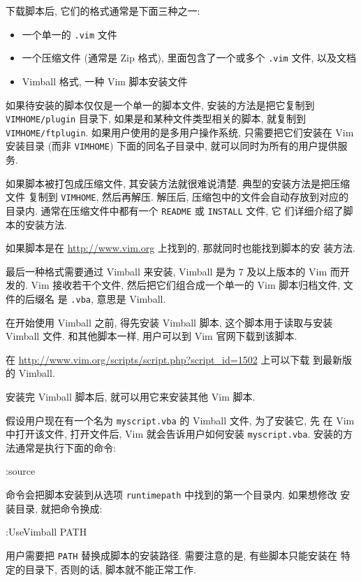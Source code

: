 下载脚本后, 它们的格式通常是下面三种之一:
\begin{itemize}
    \item 一个单一的 \texttt{.vim} 文件
    \item 一个压缩文件 (通常是 Zip 格式), 里面包含了一个或多个 \texttt{.vim}
        文件, 以及文档
    \item Vimball 格式, 一种 Vim 脚本安装文件
\end{itemize}

如果待安装的脚本仅仅是一个单一的脚本文件, 安装的方法是把它复制到
\texttt{VIMHOME/plugin} 目录下, 如果是和某种文件类型相关的脚本, 就复制到
\texttt{VIMHOME/ftplugin}.
如果用户使用的是多用户操作系统, 只需要把它们安装在 Vim 安装目录 (而非
\texttt{VIMHOME}) 下面的同名子目录中, 就可以同时为所有的用户提供服务.

如果脚本被打包成压缩文件, 其安装方法就很难说清楚. 典型的安装方法是把压缩文件
复制到 \texttt{VIMHOME}, 然后再解压. 解压后, 压缩包中的文件会自动存放到对应的
目录内. 通常在压缩文件中都有一个 \texttt{README} 或 \texttt{INSTALL} 文件, 它
们详细介绍了脚本的安装方法.

\begin{warning}
    如果脚本是在 \url{http://www.vim.org} 上找到的, 那就同时也能找到脚本的安
    装方法.
\end{warning}

最后一种格式需要通过 Vimball 来安装, Vimball 是为 7 及以上版本的 Vim 而开发的.
Vim 接收若干个文件, 然后把它们组合成一个单一的 Vim 脚本归档文件, 文件的后缀名
是 \texttt{.vba}, 意思是 Vimball.

在开始使用 Vimball 之前, 得先安装 Vimball 脚本, 这个脚本用于读取与安装 Vimball
文件. 和其他脚本一样, 用户可以到 Vim 官网下载到该脚本.

\begin{warning}
    在 \url{http://www.vim.org/scripts/script.php?script_id=1502} 上可以下载
    到最新版的 Vimball.
\end{warning}

安装完 Vimball 脚本后, 就可以用它来安装其他 Vim 脚本.

假设用户现在有一个名为 \texttt{myscript.vba} 的 Vimball 文件, 为了安装它, 先
在 Vim 中打开该文件, 打开文件后, Vim 就会告诉用户如何安装
\texttt{myscript.vba}. 安装的方法通常是执行下面的命令:
\begin{vimcode}
:source %
\end{vimcode}
命令会把脚本安装到从选项 \texttt{runtimepath} 中找到的第一个目录内. 如果想修改
安装目录, 就把命令换成:
\begin{vimcode}
:UseVimball PATH
\end{vimcode}
用户需要把 \texttt{PATH} 替换成脚本的安装路径. 需要注意的是, 有些脚本只能安装在
特定的目录下, 否则的话, 脚本就不能正常工作.

